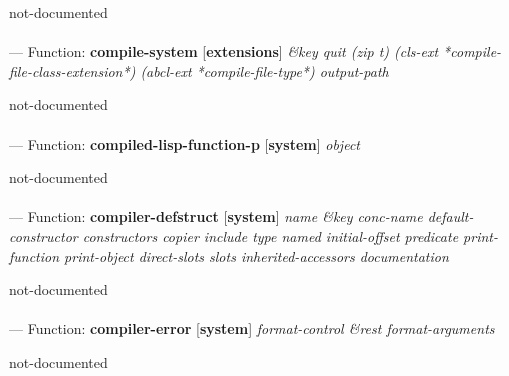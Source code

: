 \begin{adjustwidth}{5em}{5em}
not-documented
\end{adjustwidth}

\paragraph{}
\label{EXTENSIONS:COMPILE-SYSTEM}
--- Function: \textbf{compile-system} [\textbf{extensions}] \textit{\&key quit (zip t) (cls-ext *compile-file-class-extension*) (abcl-ext *compile-file-type*) output-path}

\begin{adjustwidth}{5em}{5em}
not-documented
\end{adjustwidth}

\paragraph{}
\label{SYSTEM:COMPILED-LISP-FUNCTION-P}
--- Function: \textbf{compiled-lisp-function-p} [\textbf{system}] \textit{object}

\begin{adjustwidth}{5em}{5em}
not-documented
\end{adjustwidth}

\paragraph{}
\label{SYSTEM:COMPILER-DEFSTRUCT}
--- Function: \textbf{compiler-defstruct} [\textbf{system}] \textit{name \&key conc-name default-constructor constructors copier include type named initial-offset predicate print-function print-object direct-slots slots inherited-accessors documentation}

\begin{adjustwidth}{5em}{5em}
not-documented
\end{adjustwidth}

\paragraph{}
\label{SYSTEM:COMPILER-ERROR}
--- Function: \textbf{compiler-error} [\textbf{system}] \textit{format-control \&rest format-arguments}

\begin{adjustwidth}{5em}{5em}
not-documented
\end{adjustwidth}

